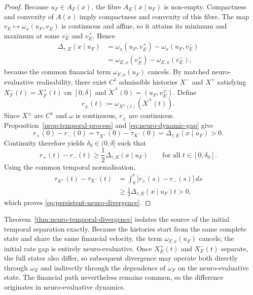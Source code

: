 \documentclass[graybox,natbib]{SNmult}
\providecommand{\1}{}
\renewcommand{\1}{\mathbbm 1}
\begin{document}
\begin{proof}

Because \(u_F\in A_F(x)\), the fibre \(A_E(x\mid u_F)\) is non-empty.
Compactness and convexity of \(A(x)\) imply compactness and convexity of this
fibre. The map \(v_E\mapsto\omega_x(u_F,v_E)\) is continuous and affine, so it
attains its minimum and maximum at some \(v_E^-\) and \(v_E^+\). Hence
\begin{align}
\Delta_{\tau,E}(x\mid u_F)
&=
\omega_x(u_F,v_E^+)-\omega_x(u_F,v_E^-)
\nonumber\\
&=
\omega_{E,x}(v_E^+)-\omega_{E,x}(v_E^-),
\label{eq:neuro-dynamic-gap}
\end{align}
because the common financial term \(\omega_{F,x}(u_F)\) cancels. By matched neuro-evaluative realisability, there exist \(C^1\) admissible
histories \(X^-\) and \(X^+\) satisfying
\(X_F^-(t)=X_F^+(t)\) on \([0,\delta]\) and
\(\dot X^\pm(0)=(u_F,v_E^\pm)\). Define
\[
r_\pm(t)
:=
\omega_{X^\pm(t)}\!\left(\dot X^\pm(t)\right).
\]
Since \(X^\pm\) are \(C^1\) and \(\omega\) is continuous, \(r_\pm\) are
continuous. Proposition~\ref{prop:temporal-process} and
\eqref{eq:neuro-dynamic-gap} give
\[
r_+(0)-r_-(0)
=
\dot\tau_{X^+}(0)-\dot\tau_{X^-}(0)
=
\Delta_{\tau,E}(x\mid u_F)>0.
\]
Continuity therefore yields \(\delta_0\in(0,\delta]\) such that
\[
r_+(t)-r_-(t)
\geq
\frac{1}{2}\Delta_{\tau,E}(x\mid u_F)
\qquad
\text{for all }t\in[0,\delta_0].
\]
Using the common temporal normalisation,
\[
\begin{aligned}
\tau_{X^+}(t)-\tau_{X^-}(t)
&=
\int_0^t
\bigl[r_+(s)-r_-(s)\bigr]\,ds
\\
&\geq
\frac{1}{2}\Delta_{\tau,E}(x\mid u_F)t
>0,
\end{aligned}
\]
which proves \eqref{eq:persistent-neuro-divergence}.
\end{proof}

Theorem~\ref{thm:neuro-temporal-divergence} isolates the source of the initial
temporal separation exactly. Because the histories start from the same
complete state and share the same financial velocity, the term
\(\omega_{F,x}(u_F)\) cancels; the initial rate gap is entirely
neuro-evaluative. Once \(X_E^+(t)\) and \(X_E^-(t)\) separate, the full states
also differ, so subsequent divergence may operate both directly through
\(\omega_E\) and indirectly through the dependence of \(\omega_F\) on the
neuro-evaluative state. The financial path nevertheless remains common, so the
difference originates in neuro-evaluative dynamics.
\end{document}
